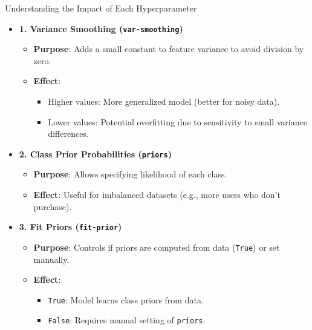 \begin{frame}{Understanding the Impact of Each Hyperparameter}
	\begin{itemize}
		\item \textbf{1. Variance Smoothing (\texttt{var-smoothing})}
		\begin{itemize}
			\item \textbf{Purpose}: Adds a small constant to feature variance to avoid division by zero.
			\item \textbf{Effect}: 
			\begin{itemize}
				\item Higher values: More generalized model (better for noisy data).
				\item Lower values: Potential overfitting due to sensitivity to small variance differences.
			\end{itemize}
		
		\end{itemize}
		
		\item \textbf{2. Class Prior Probabilities (\texttt{priors})}
		\begin{itemize}
			\item \textbf{Purpose}: Allows specifying likelihood of each class.
			\item \textbf{Effect}: Useful for imbalanced datasets (e.g., more users who don’t purchase).
		
		\end{itemize}
			\end{itemize}
			\end{frame}
		\begin{itemize}	
		\item \textbf{3. Fit Priors (\texttt{fit-prior})}
		\begin{itemize}
			\item \textbf{Purpose}: Controls if priors are computed from data (\texttt{True}) or set manually.
			\item \textbf{Effect}:
			\begin{itemize}
				\item \texttt{True}: Model learns class priors from data.
				\item \texttt{False}: Requires manual setting of \texttt{priors}.
			\end{itemize}
		
		\end{itemize}
	\end{itemize}


